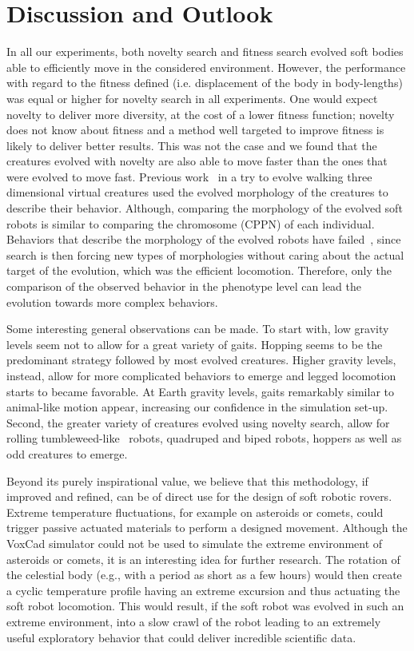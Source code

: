 \documentclass{sig-alternate}
\begin{document}
\section{Discussion and Outlook}
In all our experiments, both novelty search and fitness search evolved soft bodies able to efficiently move in the considered environment. However, the performance with regard to the fitness defined (i.e. displacement of the body in body-lengths) was equal or higher for novelty search in all experiments. One would expect novelty to deliver more diversity, at the cost of a lower fitness function; novelty does not know about fitness and a method well targeted to improve fitness is likely to deliver better results. This was not the case and we found that the creatures evolved with novelty are also able to move faster than the ones that were evolved to move fast. Previous work~\cite{lehman2011evolving} in a try to evolve walking three dimensional virtual creatures used the evolved morphology of the creatures to describe their behavior. Although, comparing the morphology of the evolved soft robots is similar to comparing the chromosome (CPPN) of each individual. Behaviors that describe the morphology of the evolved robots have failed~\cite{lehman2011evolving}, since search is then forcing new types of morphologies without caring about the actual target of the evolution, which was the efficient locomotion. Therefore, only the comparison of the observed behavior in the phenotype level can lead the evolution towards more complex behaviors. 

Some interesting general observations can be made. To start with, low gravity levels seem not to allow for a great variety of gaits. Hopping seems to be the predominant strategy followed by most evolved creatures. Higher gravity levels, instead, allow for more complicated behaviors to emerge and legged locomotion starts to became favorable. At Earth gravity levels, gaits remarkably similar to animal-like motion appear, increasing our confidence in the simulation set-up. Second, the greater variety of creatures evolved using novelty search, allow for rolling tumbleweed-like~\cite{antol2003low} robots, quadruped and biped robots, hoppers as well as odd creatures to emerge. 

Beyond its purely inspirational value, we believe that this methodology, if improved and refined, can be of direct use for the design of soft robotic rovers. Extreme temperature fluctuations, for example on asteroids or comets, could trigger passive actuated materials to perform a designed movement. Although the VoxCad simulator could not be used to simulate the extreme environment of asteroids or comets, it is an interesting idea for further research. The rotation of the celestial body (e.g., with a period as short as a few hours) would then create a cyclic temperature profile having an extreme excursion and thus actuating the soft robot locomotion. This would result, if the soft robot was evolved in such an extreme environment, into a slow crawl of the robot leading to an extremely useful exploratory behavior that could deliver incredible scientific data. %
\end{document}
